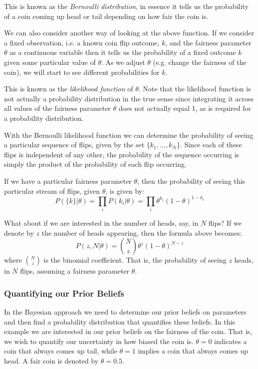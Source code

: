 This is known as the \emph{Bernoulli distribution}, in essence it tells us the probability of a coin coming up head or tail depending on how fair the coin is.

We can also consider another way of looking at the above function. If we consider a fixed observation, i.e. a known coin flip outcome, $k$, and the fairness parameter $\theta$ as a continuous variable then it tells us the probability of a fixed outcome $k$ given some particular value of $\theta$. As we adjust $\theta$ (e.g. change the fairness of the coin), we will start to see different probabilities for $k$.

This is known as the \emph{likelihood function} of $\theta$. Note that the likelihood function is not actually a probability distribution in the true sense since integrating it across all values of the fairness parameter $\theta$ does not actually equal 1, as is required for a probability distribution.

With the Bernoulli likelihood function we can determine the probability of seeing a particular sequence of flips, given by the set $\{k_1,\ldots,k_N\}$. Since each of these flips is independent of any other, the probability of the sequence occurring is simply the product of the probability of each flip occurring.

If we have a particular fairness parameter $\theta$, then the probability of seeing this particular stream of flips, given $\theta$, is given by:
\begin{equation}
  P(\{k\}|\theta)=\prod_{i}P(k_i|\theta)=\prod_i \theta^{k_i}(1-\theta)^{1-k_i}
\end{equation}

What about if we are interested in the number of heads, say, in $N$ flips? If we denote by $z$ the number of heads appearing, then the formula above becomes:
\begin{equation}
  P(z,N|\theta) = \binom{N}{z}\theta^z(1-\theta)^{N-z}
\end{equation}
where $\binom{N}{z}$ is the binomial coefficient. That is, the probability of seeing $z$ heads, in $N$ flips, assuming a fairness parameter $\theta$. 

\subsubsection{Quantifying our Prior Beliefs}
In the Bayesian approach we need to determine our prior beliefs on parameters and then find a probability distribution that quantifies these beliefs.
In this example we are interested in our prior beliefs on the fairness of the coin. That is, we wish to quantify our uncertainty in how biased the coin is. $\theta=0$ indicates a coin that always comes up tail, while $\theta=1$ implies a coin that always comes up head. A fair coin is denoted by $\theta=0.5$.

